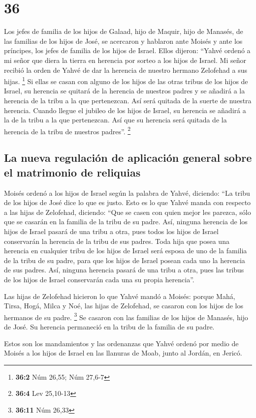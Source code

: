 \hypertarget{section-35}{%
\section{36}\label{section-35}}

 Los jefes de familia de los hijos de Galaad, hijo de
Maquir, hijo de Manasés, de las familias de los hijos de José, se
acercaron y hablaron ante Moisés y ante los príncipes, los jefes de
familia de los hijos de Israel.  Ellos dijeron: ``Yahvé
ordenó a mi señor que diera la tierra en herencia por sorteo a los hijos
de Israel. Mi señor recibió la orden de Yahvé de dar la herencia de
nuestro hermano Zelofehad a sus hijas. \footnote{\textbf{36:2} Núm
  26,55; Núm 27,6-7}  Si ellas se casan con alguno de los
hijos de las otras tribus de los hijos de Israel, su herencia se quitará
de la herencia de nuestros padres y se añadirá a la herencia de la tribu
a la que pertenezcan. Así será quitada de la suerte de nuestra herencia.
 Cuando llegue el jubileo de los hijos de Israel, su
herencia se añadirá a la de la tribu a la que pertenezcan. Así que su
herencia será quitada de la herencia de la tribu de nuestros padres''.
\footnote{\textbf{36:4} Lev 25,10-13}

\hypertarget{la-nueva-regulaciuxf3n-de-aplicaciuxf3n-general-sobre-el-matrimonio-de-reliquias}{%
\subsection{La nueva regulación de aplicación general sobre el
matrimonio de
reliquias}\label{la-nueva-regulaciuxf3n-de-aplicaciuxf3n-general-sobre-el-matrimonio-de-reliquias}}

 Moisés ordenó a los hijos de Israel según la palabra de
Yahvé, diciendo: ``La tribu de los hijos de José dice lo que es justo.
 Esto es lo que Yahvé manda con respecto a las hijas de
Zelofehad, diciendo: ``Que se casen con quien mejor les parezca, sólo
que se casarán en la familia de la tribu de su padre. 
Así, ninguna herencia de los hijos de Israel pasará de una tribu a otra,
pues todos los hijos de Israel conservarán la herencia de la tribu de
sus padres.  Toda hija que posea una herencia en cualquier
tribu de los hijos de Israel será esposa de uno de la familia de la
tribu de su padre, para que los hijos de Israel posean cada uno la
herencia de sus padres.  Así, ninguna herencia pasará de
una tribu a otra, pues las tribus de los hijos de Israel conservarán
cada una su propia herencia''.

 Las hijas de Zelofehad hicieron lo que Yahvé mandó a
Moisés:  porque Mahá, Tirsa, Hogá, Milca y Noé, las hijas
de Zelofehad, se casaron con los hijos de los hermanos de su padre.
\footnote{\textbf{36:11} Núm 26,33}  Se casaron con las
familias de los hijos de Manasés, hijo de José. Su herencia permaneció
en la tribu de la familia de su padre.

 Estos son los mandamientos y las ordenanzas que Yahvé
ordenó por medio de Moisés a los hijos de Israel en las llanuras de
Moab, junto al Jordán, en Jericó.
